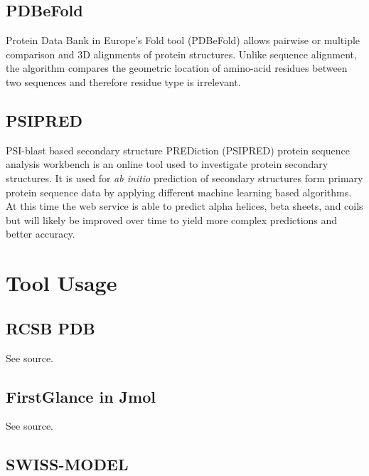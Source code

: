    \subsection{PDBeFold}

   Protein Data Bank in Europe’s Fold tool (PDBeFold) allows pairwise or multiple comparison and 3D alignments of protein structures.\autocite{B16} Unlike sequence alignment, the algorithm compares the geometric location of amino-acid residues between two sequences and therefore residue type is irrelevant.\autocite{B16}

   \subsection{PSIPRED}

   PSI-blast based secondary structure PREDiction (PSIPRED) protein sequence analysis workbench is an online tool used to investigate protein secondary structures.\autocite{B17} It is used for \emph{ab initio} prediction of secondary structures form primary protein sequence data by applying different machine learning based algorithms\autocite{B17}. At this time the web service is able to predict alpha helices, beta sheets, and coils but will likely be improved over time to yield more complex predictions and better accuracy.\autocite{B17}

\section{Tool Usage}

    \subsection{RCSB PDB}

    See source.\autocite{B13}

    \subsection{FirstGlance in Jmol}

    See source. \autocite{B14}

    \subsection{SWISS-MODEL}

